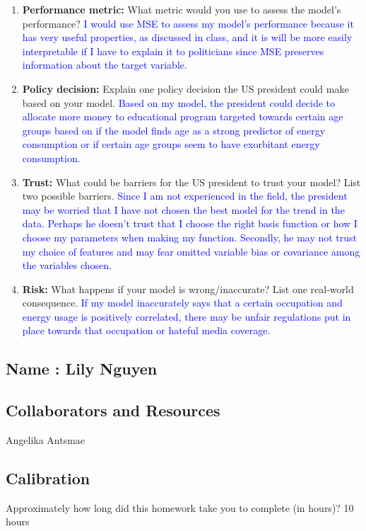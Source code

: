 \documentclass[submit]{harvardml}
\begin{document}
\begin{problem}
\begin{enumerate}
{}
\item \textbf{Performance metric:} What metric would you use to assess the model’s performance? 
\textcolor{blue}{I would use MSE to assess my model's performance because it has very useful properties, as discussed in class, and it is will be more easily interpretable if I have to explain it to politicians since MSE preserves information about the target variable.}
\item \textbf{Policy decision:} Explain one policy decision the US president could make based on your model. 
\textcolor{blue}{
Based on my model, the president could decide to allocate more money to educational program targeted towards certain age groups based on if the model finds age as a strong predictor of energy consumption or if certain age groups seem to have exorbitant energy consumption.
}
\item \textbf{Trust:} What could be barriers for the US president to trust your model?  List two possible barriers. 
\textcolor{blue}{Since I am not experienced in the field, the president may be worried that I have not chosen the best model for the trend in the data. Perhaps he doesn't trust that I choose the right basis function or how I choose my parameters when making my function. Secondly, he may not trust my choice of features and may fear omitted variable bias or covariance among the variables chosen. }
\item \textbf{Risk:} What happens if your model is wrong/inaccurate?  List one real-world consequence. 
\textcolor{blue}{If my model inaccurately says that a certain occupation and energy usage is positively correlated, there may be unfair regulations put in place towards that occupation or hateful media coverage.}


\end{enumerate}

\end{problem}

\newpage
\subsection*{Name : Lily Nguyen}

\subsection*{Collaborators and Resources}
Angelika Antsmae 

\subsection*{Calibration}
Approximately how long did this homework take you to complete (in hours)? 
10 hours
\end{document}

